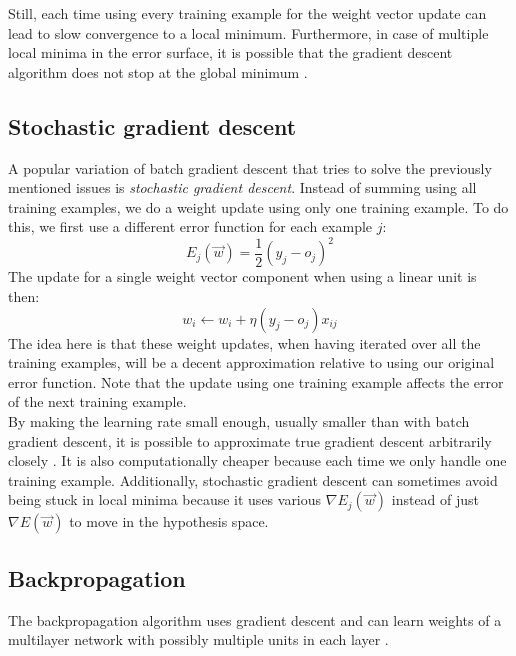 Still, each time using every training example for the weight vector update can lead to slow convergence to a local minimum. Furthermore, in case of multiple local minima in the error surface, it is possible that the gradient descent algorithm does not stop at the global minimum \citep{ML}.

\subsection{Stochastic gradient descent} %
\label{ssub:stochastic_gradient_descent}
A popular variation of batch gradient descent that tries to solve the previously mentioned issues is \textit{stochastic gradient descent}. Instead of summing using all training examples, we do a weight update using only one training example. To do this, we first use a different error function for each example $j$:
\begin{equation}
    E_j(\overrightarrow{w}) = \frac{1}{2}(y_j - o_j)^2
\end{equation}
The update for a single weight vector component when using a linear unit is then:
\begin{equation}
    w_i \gets w_i + \eta (y_j- o_j)x_{ij}
\end{equation}
The idea here is that these weight updates, when having iterated over all the training examples, will be a decent approximation relative to using our original error function. Note that the update using one training example affects the error of the next training example.\\

By making the learning rate small enough, usually smaller than with batch gradient descent, it is possible to approximate true gradient descent arbitrarily closely \citep{ML}.
It is also computationally cheaper because each time we only handle one training example.
Additionally, stochastic gradient descent can sometimes avoid being stuck in local minima because it uses various $\nabla E_j(\overrightarrow{w})$ instead of just $\nabla E(\overrightarrow{w})$ to move in the hypothesis space.

\subsection{Backpropagation} %
\label{ssub:backpropagation}
The backpropagation algorithm uses gradient descent and can learn weights of a multilayer network with possibly multiple units in each layer \citep{rumelhart1986learning}.

